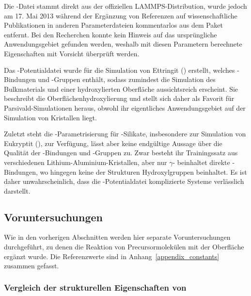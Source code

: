 Die -Datei stammt direkt aus der offiziellen LAMMPS-Distribution\cite{plimpton_lammps_2014}, wurde jedoch am 17. Mai 2013 während der Ergänzung von Referenzen auf wissenschaftliche Publikationen in anderen Parameterdateien kommentarlos aus dem Paket entfernt\cite{thompson_lammps_2013}.
Bei den Recherchen konnte kein Hinweis auf das ursprüngliche Anwendungsgebiet gefunden werden, weshalb mit diesen Parametern berechnete Eigenschaften mit Vorsicht überprüft werden.

Das -Potentialdatei wurde für die Simulation von Ettringit () erstellt, welches -Bindungen und -Gruppen enthält, sodass zumindest die Simulation des Bulkmaterials und einer hydroxylierten Oberfläche aussichtsreich erscheint.
Sie beschreibt die Oberflächenhydroxylierung und stellt sich daher als Favorit für Parsivald-Simulationen heraus, obwohl ihr eigentliches Anwendungsgebiet auf der Simulation von Kristallen liegt.

Zuletzt steht die -Parametrisierung für -Silikate, insbesondere zur Simulation von Eukryptit (), zur Verfügung, lässt aber keine endgültige Aussage über die Qualität der -Bindungen und -Gruppen zu.
Zwar besteht ihr Trainingssatz aus verschiedenen Lithium-Aluminium-Kristallen, aber nur $\gamma$- beinhaltet direkte -Bindungen, wo hingegen keine der Strukturen Hydroxylgruppen beinhaltet.
Es ist daher unwahrscheinlich, dass die -Potentialdatei komplizierte Systeme verlässlich darstellt.

\subsection{Voruntersuchungen}

Wie in den vorherigen Abschnitten werden hier separate Voruntersuchungen durchgeführt, zu denen die Reaktion von Precursormolekülen mit der Oberfläche ergänzt wurde.
Die Referenzwerte sind in Anhang~\ref{appendix_constants} zusammen gefasst.

\subsubsection{Vergleich der strukturellen Eigenschaften von \texorpdfstring{}{Al2O3}}

